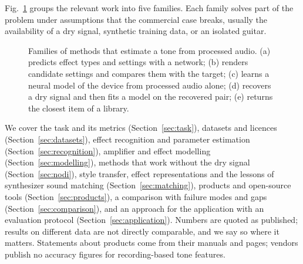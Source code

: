 Fig.~\ref{fig:families} groups the relevant work into five families. Each
family solves part of the problem under assumptions that the commercial case
breaks, usually the availability of a dry signal, synthetic training data, or
an isolated guitar.

\begin{figure}[t]
\centering
{}
\caption{Families of methods that estimate a tone from processed audio. (a)
predicts effect types and settings with a network; (b) renders candidate
settings and compares them with the target; (c) learns a neural model of the
device from processed audio alone; (d) recovers a dry signal and then fits a
model on the recovered pair; (e) returns the closest item of a library.}
\label{fig:families}
\end{figure}

We cover the task and its metrics (Section~\ref{sec:task}), datasets and
licences (Section~\ref{sec:datasets}), effect recognition and parameter
estimation (Section~\ref{sec:recognition}), amplifier and effect modelling
(Section~\ref{sec:modelling}), methods that work without the dry signal
(Section~\ref{sec:nodi}), style transfer, effect representations and the
lessons of synthesizer sound matching (Section~\ref{sec:matching}), products
and open-source tools (Section~\ref{sec:products}), a comparison with failure
modes and gaps (Section~\ref{sec:comparison}), and an approach for the
application with an evaluation protocol (Section~\ref{sec:application}).
Numbers are quoted as published; results on different data are not directly
comparable, and we say so where it matters. Statements about products come
from their manuals and pages; vendors publish no accuracy figures for
recording-based tone features.
